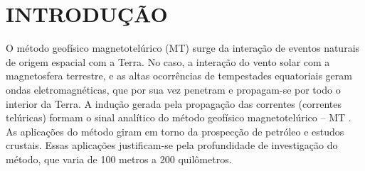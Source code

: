 \setcounter{page}{14}
\chapter{INTRODUÇÃO}
   


    
    
    O método geofísico magnetotelúrico (MT) surge da interação de eventos naturais de origem espacial com a Terra. No caso, a interação do vento solar com a magnetosfera terrestre, e as altas ocorrências de tempestades equatoriais geram ondas eletromagnéticas, que por sua vez penetram e propagam-se por todo o interior da Terra. A indução gerada pela propagação das correntes (correntes telúricas) formam o sinal analítico do método geofísico magnetotelúrico -- MT \cite{parkinson93}. As aplicações do método giram em torno da prospecção de petróleo e estudos crustais. Essas aplicações justificam-se pela profundidade de investigação do método, que varia de 100 metros a 200 quilômetros.


